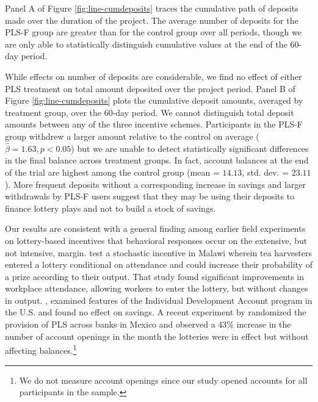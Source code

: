\documentclass[12pt]{article}
\begin{document}
		Panel A of Figure \ref{fig:line-cumdeposits} traces the cumulative path of deposits made over the duration of the project. The average number of deposits for the PLS-F group are greater than for the control group over all periods, though we are only able to statistically distinguish cumulative values at the end of the 60-day period.

		While effects on number of deposits are considerable, we find no effect of either PLS treatment on total amount deposited over the project period. Panel B of Figure \ref{fig:line-cumdeposits} plots the cumulative deposit amounts, averaged by treatment group, over the 60-day period. We cannot distinguish total deposit amounts between any of the three incentive schemes. Participants in the PLS-F group withdrew a larger amount relative to the control on average ($\hat \beta = 1.63, p < 0.05$) but we are unable to detect statistically significant differences in the final balance across treatment groups. In fact, account balances at the end of the trial are highest among the control group (mean = $14.13$, std. dev. = $23.11$). More frequent deposits without a corresponding increase in savings and larger withdrawals by PLS-F users suggest that they may be using their deposits to finance lottery plays and not to build a stock of savings.

		

		Our results are consistent with a general finding among earlier field experiments on lottery-based incentives that behavioral responses occur on the extensive, but not intensive, margin. \textcite{brune_effect_2015} test a stochastic incentive in Malawi wherein tea harvesters entered a lottery conditional on attendance and could increase their probability of a prize according to their output. That study found significant improvements in workplace attendance, allowing workers to enter the lottery, but without changes in output. \textcite{loibl_testing_2016}, examined features of the Individual Development Account program in the U.S. and found no effect on savings. A recent experiment by \textcite{gertler_long-term_2017} randomized the provision of PLS across banks in Mexico and observed a 43\% increase in the number of account openings in the month the lotteries were in effect but without affecting balances.\footnote{We do not measure account openings since our study opened accounts for all participants in the sample.}
\end{document}
